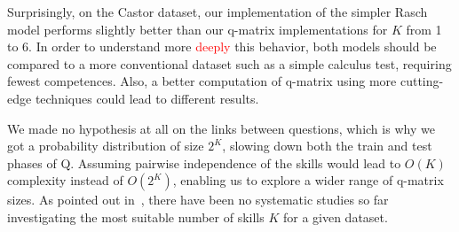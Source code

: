 \documentclass{sig-alternate}
\newcommand\alert[1]{\textcolor{red}{#1}}
\begin{document}


Surprisingly, on the Castor dataset, our implementation of the simpler Rasch model performs slightly better than our q-matrix implementations for $K$ from 1 to 6. In order to understand more \alert{deeply} this behavior, both models should be compared to a more conventional dataset such as a simple calculus test, requiring fewest competences. Also, a better computation of q-matrix using more cutting-edge techniques could lead to different results. %




We made no hypothesis at all on the links between questions, which is why we got a probability distribution of size $2^K$, slowing down both the train and test phases of Q. Assuming pairwise independence of the skills would lead to $O(K)$ complexity instead of $O(2^K)$, enabling us to explore a wider range of q-matrix sizes. As pointed out in~\cite{Huebner2010}, there have been no systematic studies so far investigating the most suitable number of skills $K$ for a given dataset. %
\end{document}
